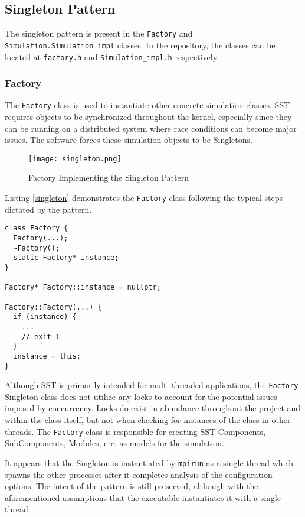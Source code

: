 \subsection{Singleton Pattern}
The singleton pattern is present in the \texttt{Factory} and \texttt{Simulation.Simulation\_impl} classes. In the repository, the classes can be located at \texttt{factory.h} and \texttt{Simulation\_impl.h} respectively.

\subsubsection{Factory}
The \texttt{Factory} class is used to instantiate other concrete simulation classes. SST requires objects to be synchronized throughout the kernel, especially since they can be running on a distributed system where race conditions can become major issues. The software forces these simulation objects to be Singletons.

\begin{figure}[ht]
    \caption{Factory Implementing the Singleton Pattern}
    \centering
    \texttt{[image: singleton.png]}
\end{figure}
\newpage

Listing \ref{singleton} demonstrates the \texttt{Factory} class following the typical steps dictated by the pattern.

\begin{lstlisting}[style=customC++,label=singleton,caption=Factory Implementing the Singleton Pattern \\ Files: src/sst/core/factory.h and src/sst/core/factory.cc]
class Factory {
  Factory(...);
  ~Factory();
  static Factory* instance;
}

Factory* Factory::instance = nullptr;

Factory::Factory(...) {
  if (instance) {
    ...
    // exit 1
  }
  instance = this;
}
\end{lstlisting}

Although SST is primarily intended for multi-threaded applications, the \texttt{Factory} Singleton class does not utilize any locks to account for the potential issues imposed by concurrency. Locks do exist in abundance throughout the project and within the class itself, but not when checking for instances of the class in other threads. The \texttt{Factory} class is responsible for creating SST Components, SubComponents, Modules, etc. as models for the simulation.

It appears that the Singleton is instantiated by \texttt{mpirun} as a single thread which spawns the other processes after it completes analysis of the configuration options. The intent of the pattern is still preserved, although with the aforementioned assumptions that the executable instantiates it with a single thread.
\newpage

